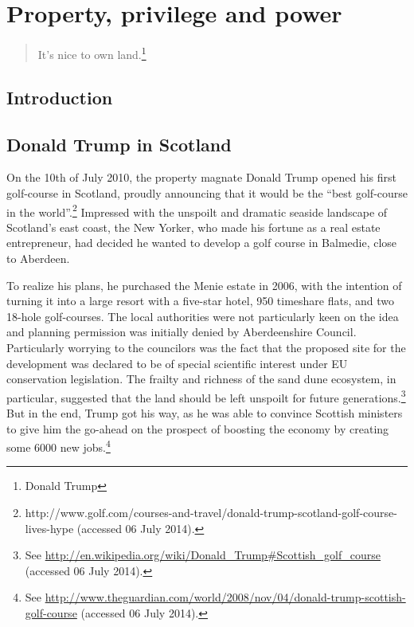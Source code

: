 \chapter{Property, privilege and power}\label{chap:1}

\begin{quote}
It's nice to own land.\footnote{Donald Trump}
\end{quote}

\section{Introduction}

\section{Donald Trump in Scotland}

On the 10th of July 2010, the property magnate Donald Trump opened his first golf-course in Scotland, proudly announcing that it would be the ``best golf-course in the world''.\footnote{http://www.golf.com/courses-and-travel/donald-trump-scotland-golf-course-lives-hype (accessed 06 July 2014).} Impressed with the unspoilt and dramatic seaside landscape of Scotland's east coast, the New Yorker, who made his fortune as a real estate entrepreneur, had decided he wanted to develop a golf course in Balmedie, close to Aberdeen.

To realize his plans, he purchased the Menie estate in 2006, with the intention of turning it into a large resort with a five-star hotel, 950 timeshare flats, and two 18-hole golf-courses. The local authorities were not particularly keen on the idea and planning permission was initially denied by Aberdeenshire Council. Particularly worrying to the councilors was the fact that the proposed site for the development was declared to be of special scientific interest under EU conservation legislation. The frailty and richness of the sand dune ecosystem, in particular, suggested that the land should be left unspoilt for future generations.\footnote{See \url{http://en.wikipedia.org/wiki/Donald_Trump#Scottish_golf_course} (accessed 06 July 2014).} But in the end, Trump got his way, as he was able to convince Scottish ministers to give him the go-ahead on the prospect of boosting the economy by creating some 6000 new jobs.\footnote{See \url{http://www.theguardian.com/world/2008/nov/04/donald-trump-scottish-golf-course} (accessed 06 July 2014).}


